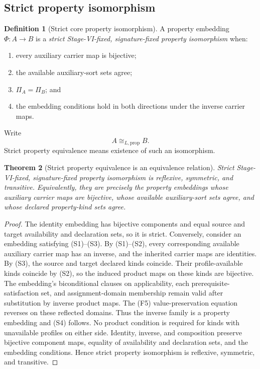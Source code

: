 \documentclass[11pt]{article}
\newtheorem{theorem}{Theorem}[section]
\theoremstyle{definition}
\newtheorem{definition}[theorem]{Definition}
\theoremstyle{remark}
\begin{document}
\subsection{Strict property isomorphism}

\begin{definition}[Strict core property isomorphism]
\label{def:strict-iso}
A property embedding \(\Phi:A\to B\) is a \emph{strict Stage-VI-fixed, signature-fixed property isomorphism} when:
\begin{enumerate}[label=(S\arabic*)]
\item every auxiliary carrier map is bijective;
\item the available auxiliary-sort sets agree;
\item \(\Pi_A=\Pi_B\); and
\item the embedding conditions hold in both directions under the inverse carrier maps.
\end{enumerate}
Write
\[
A\cong_{L,\mathrm{prop}} B.
\]
Strict property equivalence means existence of such an isomorphism.
\end{definition}

\begin{theorem}[Strict property equivalence is an equivalence relation]
\label{thm:strict-equivalence}
Strict Stage-VI-fixed, signature-fixed property isomorphism is reflexive, symmetric, and transitive.
Equivalently, they are precisely the property embeddings whose auxiliary carrier maps are bijective, whose available auxiliary-sort sets agree, and whose declared property-kind sets agree.
\end{theorem}

\begin{proof}
The identity embedding has bijective components and equal source and target availability and declaration sets, so it is strict.
Conversely, consider an embedding satisfying (S1)--(S3). By (S1)--(S2), every corresponding available auxiliary carrier map has an inverse, and the inherited carrier maps are identities. By (S3), the source and target declared kinds coincide. Their profile-available kinds coincide by (S2), so the induced product maps on these kinds are bijective.
The embedding's biconditional clauses on applicability, each prerequisite-satisfaction set, and assignment-domain membership remain valid after substitution by inverse product maps. The (F5) value-preservation equation reverses on these reflected domains. Thus the inverse family is a property embedding and (S4) follows. No product condition is required for kinds with unavailable profiles on either side.
Identity, inverse, and composition preserve bijective component maps, equality of availability and declaration sets, and the embedding conditions. Hence strict property isomorphism is reflexive, symmetric, and transitive.
\end{proof}
\end{document}
